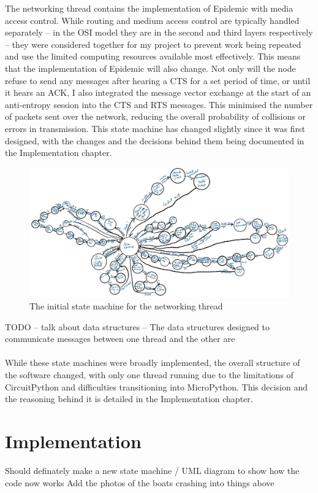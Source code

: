 \documentclass[12pt,a4paper]{report}
\newcommand{\newchapter}[2]{
    \setcounter{chapter}{#1}
    \setcounter{section}{0}
    \chapter*{#2}
    \addcontentsline{toc}{chapter}{#1 #2}
}
\begin{document}
\FloatBarrier
The networking thread contains the implementation of Epidemic with media access control. While routing and medium access control are typically handled separately -- in the OSI model they are in the second and third layers respectively -- they were considered together for my project to prevent work being repeated and use the limited computing resources available most effectively. This means that the implementation of Epidemic will also change. Not only will the node refuse to send any messages after hearing a CTS for a set period of time, or until it hears an ACK, I also integrated the message vector exchange at the start of an anti-entropy session into the CTS and RTS messages. This minimised the number of packets sent over the network, reducing the overall probability of collisions or errors in transmission. This state machine has changed slightly since it was first designed, with the changes and the decisions behind them being documented in the Implementation chapter. 
\begin{figure}[h]
\begin{center}
\caption{The initial state machine for the networking thread}
\includegraphics[scale=0.5]{net.jpg}
\end{center}
\end{figure}
\FloatBarrier
TODO -- talk about data structures -- The data structures designed to communicate messages between one thread and the other are  \\ \\
While these state machines were broadly implemented, the overall structure of the software changed, with only one thread running due to the limitations of CircuitPython and difficulties transitioning into MicroPython. This decision and the reasoning behind it is detailed in the Implementation chapter. 

\newchapter{3}{Implementation}
Should definately make a new state machine / UML diagram to show how the code now works 
Add the photos of the boats crashing into things above
\end{document}
